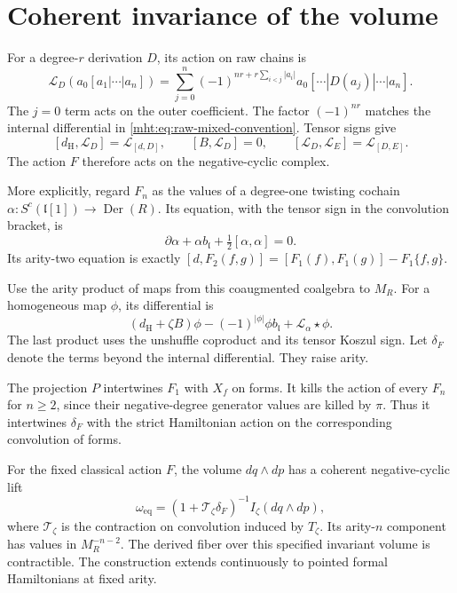 \section{Coherent invariance of the volume}

For a degree-$r$ derivation $D$, its action on raw chains is
\begin{equation}\label{mht:eq:raw-lie-derivative}
 \mathcal L_D(a_0[a_1|\cdots|a_n])
 =\sum_{j=0}^n(-1)^{nr+r\sum_{i<j}|a_i|}
    a_0[\cdots|D(a_j)|\cdots|a_n].
\end{equation}
The $j=0$ term acts on the outer coefficient. The factor
$(-1)^{nr}$ matches the internal differential in
\eqref{mht:eq:raw-mixed-convention}. Tensor signs give
\[
 [d_{\mathrm H},\mathcal L_D]=\mathcal L_{[d,D]},
 \qquad [B,\mathcal L_D]=0,
 \qquad [\mathcal L_D,\mathcal L_E]=\mathcal L_{[D,E]}.
\]
The action $F$ therefore acts on the negative-cyclic complex.

More explicitly, regard $F_n$ as the values of a degree-one
twisting cochain
$\alpha:S^c(\mathfrak l[1])\to\operatorname{Der}(R)$.
Its equation, with the tensor sign in the convolution
bracket, is
\[
 \partial\alpha+\alpha b_{\mathfrak l}
       +\tfrac12[\alpha,\alpha]=0.
\]
Its arity-two equation is exactly
$[d,F_2(f,g)]=[F_1(f),F_1(g)]-F_1\{f,g\}$.

Use the arity product of maps from this coaugmented
coalgebra to $M_R$. For a homogeneous map $\phi$, its
differential is
\[
 (d_{\mathrm H}+\zeta B)\phi
 -(-1)^{|\phi|}\phi b_{\mathfrak l}
 +\mathcal L_\alpha\star\phi.
\]
The last product uses the unshuffle coproduct and its tensor
Koszul sign. Let $\delta_F$ denote the terms beyond the
internal differential. They raise arity.

The projection $P$ intertwines $F_1$ with $X_f$ on forms.
It kills the action of every $F_n$ for $n\geq2$, since
their negative-degree generator values are killed by $\pi$.
Thus it intertwines $\delta_F$ with the strict Hamiltonian
action on the corresponding convolution of forms.

\begin{theorem}\label{mht:thm:coherent-volume}
For the fixed classical action $F$, the volume $dq\wedge dp$
has a coherent negative-cyclic lift
\begin{equation}\label{mht:eq:coherent-volume}
 \omega_{\mathrm{eq}}
 =(1+\mathcal T_\zeta\delta_F)^{-1}
                  I_\zeta(dq\wedge dp),
\end{equation}
where $\mathcal T_\zeta$ is the contraction on convolution
induced by $T_\zeta$. Its arity-$n$ component has values
in $M_R^{-n-2}$. The derived fiber over this specified
invariant volume is contractible. The construction extends
continuously to pointed formal Hamiltonians at fixed arity.
\end{theorem}

